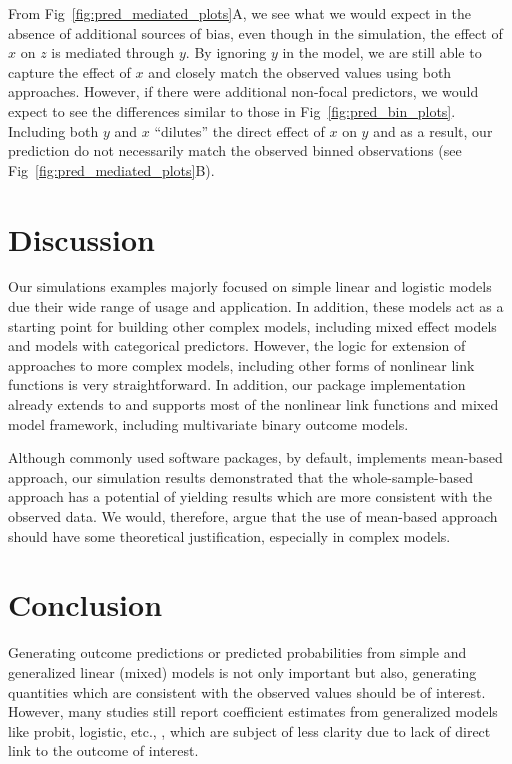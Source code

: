 From Fig~\ref{fig:pred_mediated_plots}A, we see what we would expect in the absence of additional sources of bias, even though in the simulation, the effect of $x$ on $z$ is mediated through $y$. By ignoring $y$ in the model, we are still able to capture the effect of $x$ and closely match the observed values using both approaches. However, if there were additional non-focal predictors, we would expect to see the differences similar to those in Fig~\ref{fig:pred_bin_plots}. Including both $y$ and $x$ ``dilutes'' the direct effect of $x$ on $y$ and as a result, our prediction do not necessarily match the observed binned observations (see Fig~\ref{fig:pred_mediated_plots}B).

\section{Discussion}

Our simulations examples majorly focused on simple linear and logistic models due their wide range of usage and application. In addition, these models act as a starting point for building other complex models, including mixed effect models and models with categorical predictors. However, the logic for extension of approaches to more complex models, including other forms of nonlinear link functions is very straightforward. In addition, our  package implementation already extends to and supports most of the nonlinear link functions and mixed model framework, including multivariate binary outcome models.

Although commonly used  software packages, by default, implements mean-based approach, our simulation results demonstrated that the whole-sample-based approach has a potential of yielding results which are more consistent with the observed data. We would, therefore, argue that the use of mean-based approach should have some theoretical justification, especially in complex models. 

\section{Conclusion}

Generating outcome predictions or predicted probabilities from simple and generalized linear (mixed) models is not only important but also, generating quantities which are consistent with the observed values should be of interest. However, many studies still report coefficient estimates from generalized models like probit, logistic, etc., \citep{hanmer2013behind}, which are subject of less clarity due to lack of direct link to the outcome of interest.

